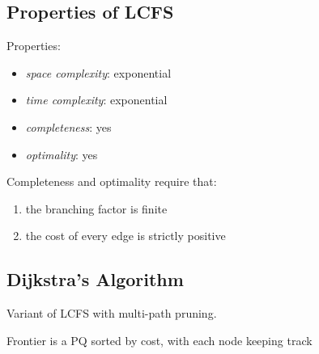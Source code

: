 \documentclass[11pt]{article}
\begin{document}
\subsection{Properties of LCFS}
\label{sec:org7169866}
Properties:
\begin{itemize}
\item \emph{space complexity}: exponential
\item \emph{time complexity}: exponential
\item \emph{completeness}: yes
\item \emph{optimality}: yes
\end{itemize}

Completeness and optimality require that:
\begin{enumerate}
\item the branching factor is finite
\item the cost of every edge is strictly positive
\end{enumerate}
\subsection{Dijkstra's Algorithm}
\label{sec:org36f3c5c}
Variant of LCFS with multi-path pruning.

Frontier is a PQ sorted by cost, with each node keeping track
\end{document}

